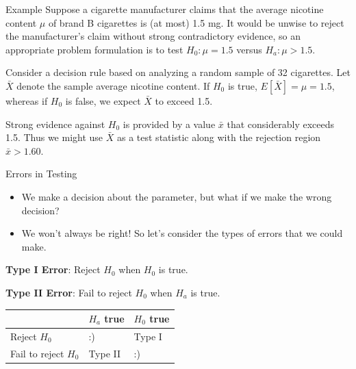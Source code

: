 \documentclass[
  ignorenonframetext,
]{beamer}
\providecommand{\tightlist}{%
  \setlength{\itemsep}{0pt}\setlength{\parskip}{0pt}}\usepackage{longtable,booktabs,array}
\begin{document}
\begin{frame}{Example}
\protect\hypertarget{example}{}
Suppose a cigarette manufacturer claims that the average nicotine
content \(\mu\) of brand B cigarettes is (at most) 1.5 mg. It would be
unwise to reject the manufacturer's claim without strong contradictory
evidence, so an appropriate problem formulation is to test
\(H_{0}: \mu = 1.5\) versus \(H_{a}: \mu > 1.5\).

Consider a decision rule based on analyzing a random sample of 32
cigarettes. Let \(\bar{X}\) denote the sample average nicotine content.
If \(H_{0}\) is true, \(E[\bar{X}] = \mu = 1.5\), whereas if \(H_{0}\)
is false, we expect \(\bar{X}\) to exceed 1.5.

Strong evidence against \(H_{0}\) is provided by a value \(\bar{x}\)
that considerably exceeds 1.5. Thus we might use \(\bar{X}\) as a test
statistic along with the rejection region \(\bar{x} > 1.60\).
\end{frame}

\begin{frame}{Errors in Testing}
\protect\hypertarget{errors-in-testing}{}
\begin{itemize}[<+->]
\tightlist
\item
  We make a decision about the parameter, but what if we make the wrong
  decision?
\item
  We won't always be right! So let's consider the types of errors that
  we could make.
\end{itemize}

\begin{tcolorbox}[enhanced jigsaw, left=2mm, breakable, bottomrule=.15mm, colframe=quarto-callout-important-color-frame, arc=.35mm, leftrule=.75mm, colbacktitle=quarto-callout-important-color!10!white, titlerule=0mm, opacityback=0, coltitle=black, opacitybacktitle=0.6, colback=white, toprule=.15mm, toptitle=1mm, bottomtitle=1mm, title=\textcolor{quarto-callout-important-color}{\faExclamation}\hspace{0.5em}{Errors}, rightrule=.15mm]

\textbf{Type I Error}: Reject \(H_{0}\) when \(H_{0}\) is true.

\textbf{Type II Error}: Fail to reject \(H_{0}\) when \(H_{a}\) is true.

\end{tcolorbox}

\begin{longtable}[]{@{}lll@{}}
\toprule()
& \(H_{a}\) true & \(H_{0}\) true \\
\midrule()
\endhead
Reject \(H_{0}\) & :) & Type I \\
Fail to reject \(H_{0}\) & Type II & :) \\
\bottomrule()
\end{longtable}
\end{frame}
\end{document}
